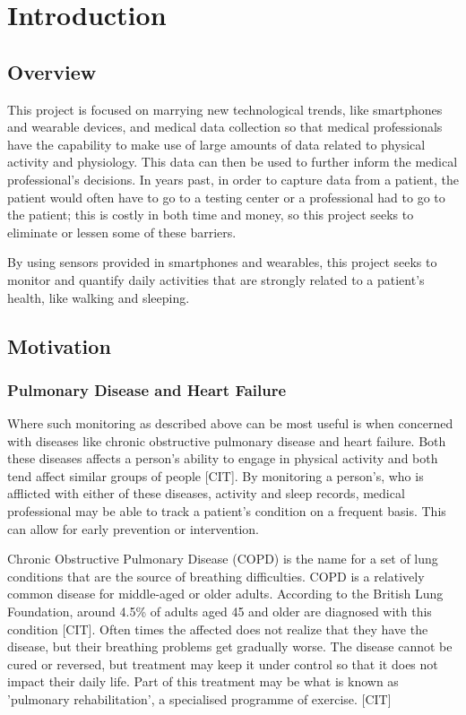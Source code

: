 \part{Introduction}

    \chapter{Overview}

        This project is focused on marrying new technological trends, like smartphones and wearable devices, and medical data collection so that medical professionals have the capability to make use of large amounts of data related to physical activity and physiology. This data can then be used to further inform the medical professional's decisions. In years past, in order to capture data from a patient, the patient would often have to go to a testing center or a professional had to go to the patient; this is costly in both time and money, so this project seeks to eliminate or lessen some of these barriers. 

        By using sensors provided in smartphones and wearables, this project seeks to monitor and quantify daily activities that are strongly related to a patient's health, like walking and sleeping.

    \chapter{Motivation}

        \section{Pulmonary Disease and Heart Failure}

            Where such monitoring as described above can be most useful is when concerned with diseases like chronic obstructive pulmonary disease and heart failure. Both these diseases affects a person's ability to engage in physical activity and both tend affect similar groups of people [CIT]. By monitoring a person's, who is afflicted with either of these diseases, activity and sleep records, medical professional may be able to track a patient's condition on a frequent basis. This can allow for early prevention or intervention.

            Chronic Obstructive Pulmonary Disease (COPD) is the name for a set of lung conditions that are the source of breathing difficulties. COPD is a relatively common disease for middle-aged or older adults. According to the British Lung Foundation, around 4.5\% of adults aged 45 and older are diagnosed with this condition [CIT]. Often times the affected does not realize that they have the disease, but their breathing problems get gradually worse. The disease cannot be cured or reversed, but treatment may keep it under control so that it does not impact their daily life. Part of this treatment may be what is known as 'pulmonary rehabilitation', a specialised programme of exercise. [CIT]


